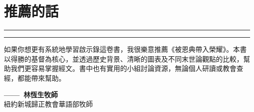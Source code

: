 \providecommand{\RecSign}[2]{%
  \par\nopagebreak\vspace{2pt}%
  {\raggedleft\parskip=0pt
    {\color{burgundy}\bfseries ——\ #1}\\[1pt]
    {\footnotesize\color{black!65}#2}\par}}

\ifdefined\RecTitle\else
\newcommand{\RecTitle}[1]{%
  {\noindent\color{burgundy}\bfseries #1\par}\medskip}
\fi

\ifdefined\Recommendation\else
\newenvironment{Recommendation}[2]
{%
  \def\RecName{#1}\def\RecRole{#2}%
  \begin{tcolorbox}[
      enhanced,
      breakable,
      width=\textwidth,
      colback=burgundy!3,
      colframe=burgundy!60,
      boxrule=0pt,
      leftrule=2pt,
      arc=0pt,
      left=10pt, right=8pt, top=8pt, bottom=4pt,
      before skip=10pt, after skip=14pt,
  ]
  \setlength{\parindent}{2em}\linespread{1.2}\selectfont
}
{%
  \RecSign{\RecName}{\RecRole}%
  \end{tcolorbox}%
}
\fi

\providecommand{\RecOrnament}{%
  \begin{center}
    {\color{burgundy!60}\rule[0.5ex]{0.12\textwidth}{0.4pt}\quad
     \ding{167}\quad
     \rule[0.5ex]{0.12\textwidth}{0.4pt}}
  \end{center}\vspace{-0.5em}}


\chapter*{推薦的話}
\RecOrnament

\begin{Recommendation}{林恆生牧師}{紐約新城歸正教會華語部牧師}
如果你想更有系統地學習啟示錄這卷書，我很樂意推薦《被恩典帶入榮耀》。本書以得勝的基督為核心，並透過歷史背景、清晰的圖表及不同末世論觀點的比較，幫助我們更容易掌握經文。書中也有實用的小組討論資源，無論個人研讀或教會查經，都能帶來幫助。
\end{Recommendation}

